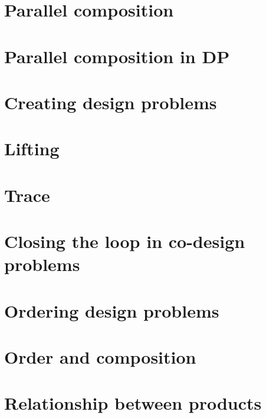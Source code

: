 \documentclass[paper=6in:9in,pagesize=pdftex,
 headinclude=off,footinclude=on,11pt,twoside]{scrbook}
\begin{document}
\chapter{Parallel composition}

\clearpage

\chapter{Parallel composition in DP}

\clearpage

\chapter{Creating design problems}

\clearpage

\chapter{Lifting}

\clearpage

\chapter{Trace}

\clearpage

\chapter{Closing the loop in co-design problems}

\clearpage

\chapter{Ordering design problems}

\clearpage

\chapter{Order and composition}

\clearpage

\chapter{Relationship between products}

\clearpage
\end{document}
